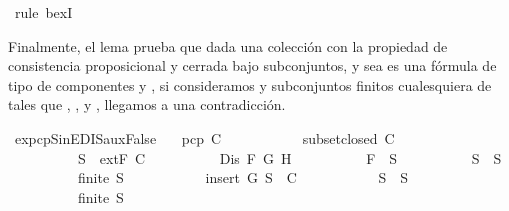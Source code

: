 \begin{isabellebody}
\ {\isacharparenleft}rule\ bexI{\isacharparenright}\isanewline
{}\isamarkupfalse%
%
\endisatagproof
{\isafoldproof}%
%
\isadelimproof
%
\endisadelimproof
%
\begin{isamarkuptext}%
Finalmente, el lema  prueba que dada una colección  con la 
  propiedad de consistencia proposicional y cerrada bajo subconjuntos,  y sea  es una 
  fórmula de tipo \isa{{\isasymbeta}} de componentes  y , si consideramos  y  subconjuntos finitos 
  cualesquiera de  tales que , ,  y , llegamos a 
  una contradicción.%
\end{isamarkuptext}\isamarkuptrue%
\isamarkupfalse%
\ ex{}{\isacharunderscore}pcp{\isacharunderscore}SinE{\isacharunderscore}DIS{\isacharunderscore}auxFalse{\isacharcolon}\isanewline
\ \ \ {\isachardoublequoteopen}pcp\ C{\isachardoublequoteclose}\ \isanewline
\ \ \ \ \ \ \ \ \ \ {\isachardoublequoteopen}subset{\isacharunderscore}closed\ C{\isachardoublequoteclose}\isanewline
\ \ \ \ \ \ \ \ \ \ {\isachardoublequoteopen}S\ {\isasymin}\ {\isacharparenleft}extF\ C{\isacharparenright}{\isachardoublequoteclose}\isanewline
\ \ \ \ \ \ \ \ \ \ {\isachardoublequoteopen}Dis\ F\ G\ H{\isachardoublequoteclose}\isanewline
\ \ \ \ \ \ \ \ \ \ {\isachardoublequoteopen}F\ {\isasymin}\ S{\isachardoublequoteclose}\isanewline
\ \ \ \ \ \ \ \ \ \ {\isachardoublequoteopen}S{}\ {\isasymsubseteq}\ S{\isachardoublequoteclose}\ \isanewline
\ \ \ \ \ \ \ \ \ \ {\isachardoublequoteopen}finite\ S{}{\isachardoublequoteclose}\ \isanewline
\ \ \ \ \ \ \ \ \ \ {\isachardoublequoteopen}insert\ G\ S{}\ {\isasymnotin}\ C{\isachardoublequoteclose}\ \isanewline
\ \ \ \ \ \ \ \ \ \ {\isachardoublequoteopen}S{}\ {\isasymsubseteq}\ S{\isachardoublequoteclose}\ \isanewline
\ \ \ \ \ \ \ \ \ \ {\isachardoublequoteopen}finite\ S{}{\isachardoublequoteclose}\ \isanewline

\end{isabellebody}
